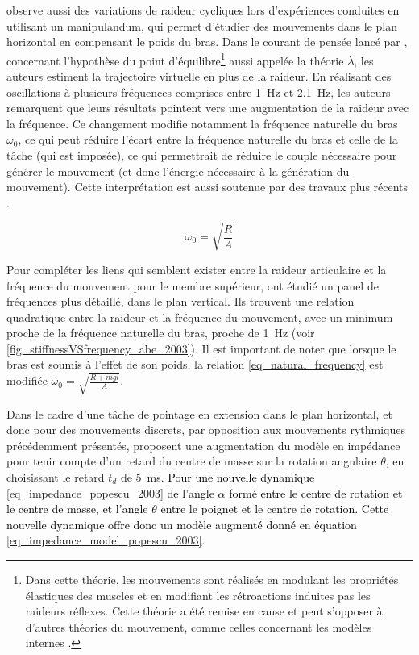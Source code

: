 \textcite{latash_virtual_1992} observe aussi des variations de raideur cycliques lors d'expériences conduites en utilisant un manipulandum, qui permet d'étudier des mouvements dans le plan horizontal en compensant le poids du bras. Dans le courant de pensée lancé par \parencite{feldman_functional_1966, bizzi_effect_1978}, concernant l'hypothèse du point d'équilibre\footnote{Dans cette théorie, les mouvements sont réalisés en modulant les propriétés élastiques des muscles et en modifiant les rétroactions induites pas les raideurs réflexes. Cette théorie a été remise en cause \parencite{popescu_end_2000,popescu_elbow_2003,hinder_case_2003} et peut s'opposer à d'autres théories du mouvement, comme celles concernant les modèles internes \parencite{wolpert_computational_2000,hinder_case_2003}.} aussi appelée la théorie $\lambda$, les auteurs estiment la trajectoire virtuelle en plus de la raideur. En réalisant des oscillations à plusieurs fréquences comprises entre \SI{1}{\hertz} et \SI{2.1}{\hertz}, les auteurs remarquent que leurs résultats pointent vers une augmentation de la raideur avec la fréquence. Ce changement modifie notamment la fréquence naturelle du bras $\omega_0$, ce qui peut réduire l'écart entre la fréquence naturelle du bras et celle de la tâche (qui est imposée), ce qui permettrait de réduire le couple nécessaire pour générer le mouvement (et donc l'énergie nécessaire à la génération du mouvement). Cette interprétation est aussi soutenue par des travaux plus récents \parencite{zawadzki_maximal_2010}.

\begin{equation} \label{eq_natural_frequency}
	\omega_0 = \sqrt{\frac{R}{A}}
\end{equation}

Pour compléter les liens qui semblent exister entre la raideur articulaire et la fréquence du mouvement pour le membre supérieur, \textcite{abe_modulation_2003} ont étudié un panel de fréquences plus détaillé, dans le plan vertical. Ils trouvent une relation quadratique entre la raideur et la fréquence du mouvement, avec un minimum proche de la fréquence naturelle du bras, proche de \SI{1}{\hertz} (voir \cref{fig_stiffnessVSfrequency_abe_2003}). Il est important de noter que lorsque le bras est soumis à l'effet de son poids, la relation \cref{eq_natural_frequency} est modifiée $\omega_0 = \sqrt{\frac{R + mgl}{A}}$.



Dans le cadre d'une tâche de pointage en extension dans le plan horizontal, et donc pour des mouvements discrets, par opposition aux mouvements rythmiques précédemment présentés, \textcite{popescu_elbow_2003} proposent une augmentation du modèle en impédance pour tenir compte d'un retard du centre de masse sur la rotation angulaire $\theta$, en choisissant le retard $t_d$ de \SI{5}{\milli\second}. \textcolor{black}{Pour une nouvelle dynamique \cref{eq_impedance_popescu_2003} de l'angle $\alpha$ formé entre le centre de rotation et le centre de masse, et l'angle $\theta$ entre le poignet et le centre de rotation. Cette nouvelle dynamique offre donc un modèle augmenté donné en équation \cref{eq_impedance_model_popescu_2003}}. 
%

